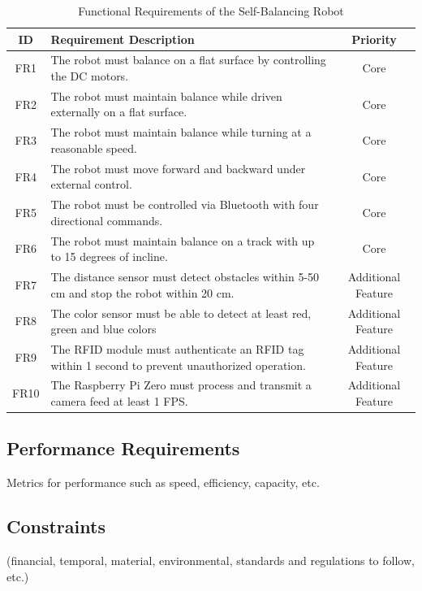 \documentclass{article}
\begin{document}
\begin{table}[H]
    \centering
    \renewcommand{\arraystretch}{1.3} %
    \begin{tabularx}{\textwidth}{|c|X|c|}
        \hline
        \textbf{ID} & \textbf{Requirement Description} & \textbf{Priority} \\
        \hline
        FR1 & The robot must balance on a flat surface by controlling the DC motors. & Core \\
        \hline
        FR2 & The robot must maintain balance while driven externally on a flat surface. & Core \\
        \hline
        FR3 & The robot must maintain balance while turning at a reasonable speed. & Core \\
        \hline
        FR4 & The robot must move forward and backward under external control. & Core \\
        \hline
        FR5 & The robot must be controlled via Bluetooth with four directional commands. & Core \\
        \hline
        FR6 & The robot must maintain balance on a track with up to 15 degrees of incline. & Core \\
        \hline
        FR7 & The distance sensor must detect obstacles within 5-50 cm and stop the robot within 20 cm. & Additional Feature \\
        \hline
        FR8 & The color sensor must be able to detect at least red, green and blue colors & Additional Feature \\
        \hline
        FR9 & The RFID module must authenticate an RFID tag within 1 second to prevent unauthorized operation. & Additional Feature \\
        \hline
        FR10 & The Raspberry Pi Zero must process and transmit a camera feed at least 1 FPS. & Additional Feature \\
        \hline
    \end{tabularx}
    \caption{Functional Requirements of the Self-Balancing Robot}
    \label{tab:functional_requirements}
\end{table}

\subsection{Performance Requirements}
Metrics for performance such as speed, efficiency, capacity, etc.
\subsection{Constraints}
(financial, temporal, material, environmental, standards and regulations to follow, etc.)
\end{document}
